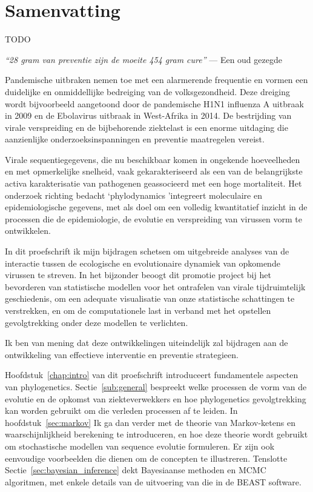 
\chapter*{Samenvatting}

TODO

\bigskip{}

\emph{``28 gram van preventie zijn de moeite 454 gram cure''}
--- Een oud gezegde

\bigskip{}

Pandemische uitbraken nemen toe met een alarmerende frequentie en vormen een duidelijke en onmiddellijke bedreiging van de volksgezondheid.
Deze dreiging wordt bijvoorbeeld aangetoond door de pandemische H1N1 influenza A uitbraak in 2009 en de Ebolavirus uitbraak in West-Afrika in 2014.
De bestrijding van virale verspreiding en de bijbehorende ziektelast is een enorme uitdaging die aanzienlijke onderzoeksinspanningen en preventie maatregelen vereist.

Virale sequentiegegevens, die nu beschikbaar komen in ongekende hoeveelheden en met opmerkelijke snelheid, vaak gekarakteriseerd als een van de belangrijkste activa karakterisatie van pathogenen geassocieerd met een hoge mortaliteit.
Het onderzoek richting bedacht `phylodynamics 'integreert moleculaire en epidemiologische gegevens, met als doel om een volledig kwantitatief inzicht in de processen die de epidemiologie, de evolutie en verspreiding van virussen vorm te ontwikkelen.

In dit proefschrift ik mijn bijdragen schetsen om uitgebreide analyses van de interactie tussen de ecologische en evolutionaire dynamiek van opkomende virussen te streven.
In het bijzonder beoogt dit promotie project bij het bevorderen van statistische modellen voor het ontrafelen van virale tijdruimtelijk geschiedenis, om een adequate visualisatie van onze statistische schattingen te verstrekken, en om de computationele last in verband met het opstellen gevolgtrekking onder deze modellen te verlichten.

Ik ben van mening dat deze ontwikkelingen uiteindelijk zal bijdragen aan de ontwikkeling van effectieve interventie en preventie strategieen.

Hoofdstuk~\ref {chap:intro} van dit proefschrift introduceert fundamentele aspecten van phylogenetics.
Sectie~\ref{sub:general} bespreekt welke processen de vorm van de evolutie en de opkomst van ziekteverwekkers en hoe phylogenetics gevolgtrekking kan worden gebruikt om die verleden processen af te leiden.
In hoofdstuk~\ref{sec:markov} Ik ga dan verder met de theorie van Markov-ketens en waarschijnlijkheid berekening te introduceren, en hoe deze theorie wordt gebruikt om stochastische modellen van sequence evolutie formuleren.
Er zijn ook eenvoudige voorbeelden die dienen om de concepten te illustreren.
Tenslotte Sectie~\ref{sec:bayesian_inference} dekt Bayesiaanse methoden en MCMC algoritmen, met enkele details van de uitvoering van die in de BEAST software.

